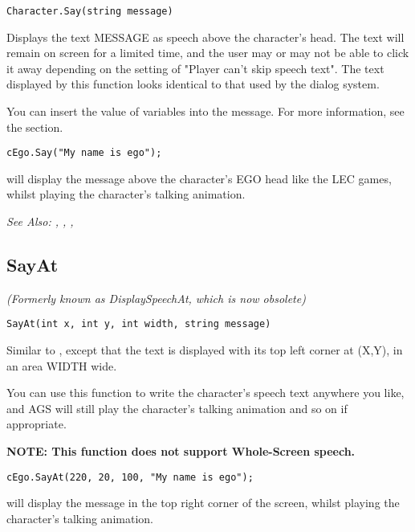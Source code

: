 \begin{verbatim}
Character.Say(string message)
\end{verbatim}
Displays the text MESSAGE as speech above the character's head.
The text will remain on screen for a limited time, and the user may or may
not be able to click it away depending on the setting of "Player can't
skip speech text". The text displayed by this function looks identical to
that used by the dialog system.

You can insert the value of variables into the message. For more information,
see the  section.

\begin{verbatim}
cEgo.Say("My name is ego");
\end{verbatim}
will display the message above the character's EGO head like the LEC games,
whilst playing the character's talking animation.

\it{See Also:} , ,
,


\subsection{SayAt}\label{Character.SayAt}%

\it{(Formerly known as DisplaySpeechAt, which is now obsolete)}

\begin{verbatim}
SayAt(int x, int y, int width, string message)
\end{verbatim}
Similar to , except that the text is displayed with its top
left corner at (X,Y), in an area WIDTH wide.

You can use this function to write the character's speech text anywhere you like, and
AGS will still play the character's talking animation and so on if appropriate.

\bf{NOTE:} This function does not support Whole-Screen speech.

\begin{verbatim}
cEgo.SayAt(220, 20, 100, "My name is ego");
\end{verbatim}
will display the message in the top right corner of the screen, whilst playing the
character's talking animation.

